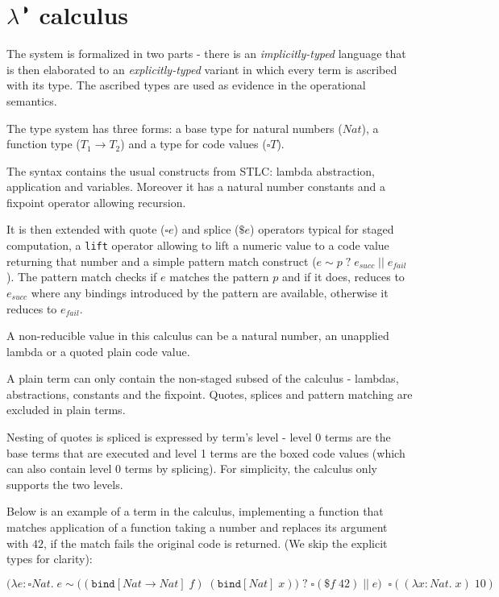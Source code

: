 \documentclass[runningheads]{article}
\begin{document}
\section{$\lambda^{\RIGHTcircle}$ calculus}

The system is formalized in two parts - there is an \textit{implicitly-typed} language that is then elaborated to an \textit{explicitly-typed} variant in which every term is ascribed with its type. The ascribed types are used as evidence in the operational semantics.

The type system has three forms: a base type for natural numbers ($Nat$), a function type ($T_1 \to T_2$) and a type for code values ($\square T$).

The syntax contains the usual constructs from STLC: lambda abstraction, application and variables. Moreover it has a natural number constants and a fixpoint operator allowing recursion.

It is then extended with quote ($\square e$) and splice ($\$e$) operators typical for staged computation, a \verb|lift| operator allowing to lift a numeric value to a code value returning that number and a simple pattern match construct ($e \sim p \; ? \; e_{succ} \; || \; e_{fail}$).
The pattern match checks if $e$ matches the pattern $p$ and if it does, reduces to $e_{succ}$ where any bindings introduced by the pattern are available, otherwise it reduces to $e_{fail}$.

A non-reducible value in this calculus can be a natural number, an unapplied lambda or a quoted plain code value. 

A plain term can only contain the non-staged subsed of the calculus - lambdas, abstractions, constants and the fixpoint. Quotes, splices and pattern matching are excluded in plain terms.

Nesting of quotes is spliced is expressed by term's level - level 0 terms are the base terms that are executed and level 1 terms are the boxed code values (which can also contain level 0 terms by splicing). For simplicity, the calculus only supports the two levels.

Below is an example of a term in the calculus, implementing a function that matches application of a function taking a number and replaces its argument with $42$, if the match fails the original code is returned. (We skip the explicit types for clarity):

\begin{equation*}
  \Big(\lambda e: \square Nat. \; e \sim \big((\texttt{bind} [Nat \to Nat] \; f) \; (\texttt{bind} [Nat] \; x)\big) \; ? \; \square(\$f \; 42) \; || \; e \Big) \;\; \square((\lambda x: Nat. \; x) \; 10)
\end{equation*}
\end{document}
